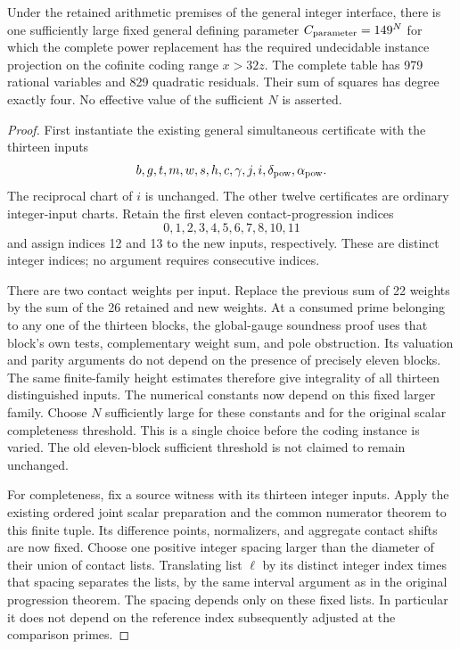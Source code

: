 \begin{theorem}
Under the retained arithmetic premises of the general integer
interface, there is one sufficiently large fixed general defining
parameter \(C_{\rm parameter}=149^N\) for which the complete power
replacement has the required undecidable instance projection on the
cofinite coding range \(x>32z\). The complete table has 979 rational
variables and 829 quadratic residuals. Their sum of squares has degree
exactly four. No effective value of the sufficient \(N\) is asserted.
\end{theorem}
\begin{proof}
First instantiate the existing general simultaneous certificate with
the thirteen inputs
\[
 b,g,t,m,w,s,h,c,\gamma,j,i,\delta_{\rm pow},\alpha_{\rm pow}.
\]
The reciprocal chart of \(i\) is unchanged. The other twelve
certificates are ordinary integer-input charts. Retain the first
eleven contact-progression indices
\[
                    0,1,2,3,4,5,6,7,8,10,11
\]
and assign indices 12 and 13 to the new inputs, respectively.
These are distinct integer indices; no argument requires consecutive
indices.

There are two contact weights per input. Replace the previous sum of
22 weights by the sum of the 26 retained and new weights. At a
consumed prime belonging to any one of the thirteen blocks, the
global-gauge soundness proof uses that block's own tests, complementary
weight sum, and pole obstruction. Its valuation and parity arguments
do not depend on the presence of precisely eleven blocks. The same
finite-family height estimates therefore give integrality of all
thirteen distinguished inputs. The numerical constants now depend
on this fixed larger family. Choose \(N\) sufficiently large for
these constants and for the original scalar completeness threshold.
This is a single choice before the coding instance is varied. The
old eleven-block sufficient threshold is not claimed to remain
unchanged.

For completeness, fix a source witness with its thirteen integer
inputs. Apply the existing ordered joint scalar preparation and the
common numerator theorem to this finite tuple. Its difference points,
normalizers, and aggregate contact shifts are now fixed. Choose one
positive integer spacing larger than the diameter of their union of
contact lists. Translating list \(\ell\) by its distinct integer
index times that spacing separates the lists, by the same interval
argument as in the original progression theorem. The spacing depends
only on these fixed lists. In particular it does not depend on the
reference index subsequently adjusted at the comparison primes.


\end{proof}
